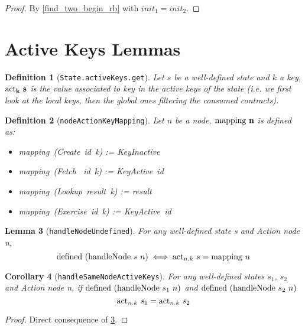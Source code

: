 \documentclass{article}
\newtheorem{lemma}{Lemma}
\newtheorem{definition}[lemma]{Definition}
\newtheorem{corollary}[lemma]{Corollary}
\newcommand{\textfun}[1]{\textup{#1}}
\newcommand{\textcode}[1]{\texttt{#1}}
\newcommand{\bolddef}[1]{\textbf{\ensuremath{\mathbf{#1}}}}
\newcommand{\fetchNode}[2]{\textfun{Fetch} \ #1\ #2}
\newcommand{\lookupNode}[2]{\textfun{Lookup}\ #1\ #2}
\newcommand{\createNode}[2]{\textfun{Create}\ #1\ #2}
\newcommand{\exNode}[2]{\textfun{Exercise}\ #1\ #2}
\newcommand{\hNode}[2]{\textfun{handleNode}\ #1\ #2}
\newcommand{\defined}[1]{\textfun{defined}\ #1}
\newcommand{\mapping}[1]{\textfun{mapping}\ #1}
\newcommand{\keyAct}[1]{\textfun{KeyActive}\ #1}
\newcommand{\keyInact}{\textfun{KeyInactive}}
\newcommand{\actkey}[2]{\textfun{act}_{#1}\ #2}
\begin{document}
\begin{proof}
    By \cref{find_two_begin_rb} with $init_1 = init_2$.
\end{proof}









\newpage


\section*{Active Keys Lemmas}

\begin{definition}[\textcode{State.activeKeys.get}]
    Let $s$ be a well-defined state and $k$ a key, \bolddef{\actkey{k}{s}} is the value associated to key in the active keys of the state 
    (i.e. we first look at the local keys, then the global ones filtering the consumed contracts).
\end{definition}

\begin{definition}[\textcode{nodeActionKeyMapping}]
    Let $n$ be a node, \bolddef{\mapping{n}} is defined as:
    \begin{itemize}
        \item \mapping{(\createNode{id}{k})} := \keyInact
        \item \mapping{(\fetchNode{id}{k})} := \keyAct{id}
        \item \mapping{(\lookupNode{result}{k})} := result
        \item \mapping{(\exNode{id}{k})} := \keyAct{id}
    \end{itemize}
\end{definition}

\begin{lemma}[\textcode{handleNodeUndefined}]
    \label{defined_def}
    For any well-defined state s and Action node n, 
    \[\defined{(\hNode{s}{n})} \iff {\actkey{n.k}{s} = \mapping{n}}\]
\end{lemma}


\begin{corollary}[\textcode{handleSameNodeActiveKeys}]
    \label{same_key_hnode}
    For any well-defined states $s_1$, $s_2$ and Action node n, if $\defined{(\hNode{s_ 1}{n})}$ and $\defined{(\hNode{s_ 2}{n})}$ 
    \[\actkey{n.k}{s_1} = \actkey{n.k}{s_2}\]
\end{corollary}

\begin{proof}
    Direct consequence of \cref{defined_def}.
\end{proof}
\end{document}
